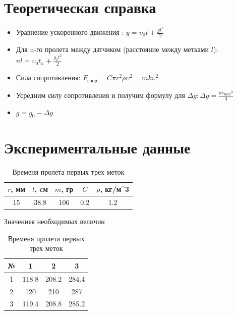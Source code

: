 \section*{Теоретическая справка}
\normalsize
\begin{itemize}
    \item{Уравнение ускоренного движения : $y = \upsilon_0 t+\frac{gt^2}{2}$}
    \item{Для n-го пролета между датчиком (расстояние между метками $l$): $nl = \upsilon_0 t_n + \frac{g_0t^2}{2}$}
    \item{Сила сопротивления: $F_{\text{сопр}} = C\pi r^2 \rho \upsilon^2 = mk\upsilon^2$}
    \item{Усредним силу сопротивления и получим формулу для $\Delta g: \Delta g = \frac{k{\upsilon_{\text{max}}}^2}{3}$ }
    \item{$g = g_0 - \Delta g$}
\end{itemize}
\section*{Экспериментальные данные}
\begin{table}[H]
    \begin{minipage}[c]{0.5\textwidth}
        \centering
        \begin{tabular}{|c|c|c|c|c|}
            \hline
            $r$, мм & $l$, cм & $m$, гр & $C$ & $\rho$, кг/м^3 \\ \hline
            15 & 38.8 & 106 & 0.2 & 1.2\\ \hline
        \end{tabular}
        \caption{Значениея необходимых величин}
        \label{tab:my_labe_1}
    \end{minipage}
    \begin{minipage}[c]{0.5\textwidth}
        \centering
        \begin{tabular}{|c|c|c|c|}
            \hline
            № & 1 & 2 & 3\\ \hline
            1 & 118.8 & 208.2 & 284.4\\ \hline
            2 & 120 & 210 & 287 \\\hline
            3 & 119.4 & 208.8 & 285.2 \\ \hline
        \end{tabular}
        \caption{Временя пролета первых трех меток}
        \label{tab:my_labe_2}
    \end{minipage}
\end{table}

